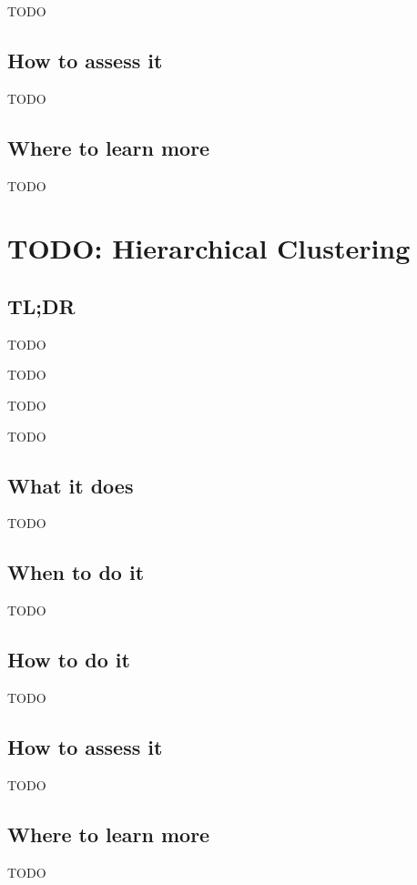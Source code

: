 \documentclass[
]{book}
\providecommand{\tightlist}{%
  \setlength{\itemsep}{0pt}\setlength{\parskip}{0pt}}
\begin{document}
TODO

\hypertarget{how-to-assess-it-21}{%
\section{How to assess it}\label{how-to-assess-it-21}}

TODO

\hypertarget{where-to-learn-more-21}{%
\section{Where to learn more}\label{where-to-learn-more-21}}

TODO

\hypertarget{hierarchical-clustering}{%
\chapter{TODO: Hierarchical Clustering}\label{hierarchical-clustering}}

\hypertarget{tldr-22}{%
\section{TL;DR}\label{tldr-22}}

\begin{description}
\tightlist
\item[What it does]
TODO
\item[When to do it]
TODO
\item[How to do it]
TODO
\item[How to assess it]
TODO
\end{description}

\hypertarget{what-it-does-22}{%
\section{What it does}\label{what-it-does-22}}

TODO

\hypertarget{when-to-do-it-22}{%
\section{When to do it}\label{when-to-do-it-22}}

TODO

\hypertarget{how-to-do-it-22}{%
\section{How to do it}\label{how-to-do-it-22}}

TODO

\hypertarget{how-to-assess-it-22}{%
\section{How to assess it}\label{how-to-assess-it-22}}

TODO

\hypertarget{where-to-learn-more-22}{%
\section{Where to learn more}\label{where-to-learn-more-22}}

TODO

  
\end{document}
